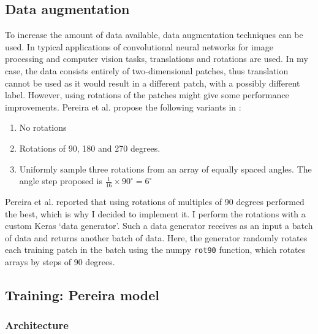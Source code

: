 \documentclass[12pt,a4paper,twoside,openright]{report}
\begin{document}
\subsection{Data augmentation}
To increase the amount of data available, data augmentation techniques can be used. In typical applications of convolutional neural networks for image processing and computer vision tasks, translations and rotations are used. In my case, the data consists entirely of two-dimensional patches, thus translation cannot be used as it would result in a different patch, with a possibly different label. However, using rotations of the patches might give some performance improvements. Pereira et al. propose the following variants in \cite{pereira}:
\begin{enumerate}
	\item No rotations
	\item Rotations of 90, 180 and 270 degrees.
	\item Uniformly sample three rotations from an array of equally spaced angles. The angle step proposed is $\frac{1}{16} \times 90^{\circ} = 6^{\circ}$
\end{enumerate}
Pereira et al. reported that using rotations of multiples of 90 degrees performed the best, which is why I decided to implement it. I perform the rotations with a custom Keras `data generator'. Such a data generator receives as an input a batch of data and returns another batch of data. Here, the generator randomly rotates each training patch in the batch using the numpy \texttt{rot90} function, which rotates arrays by steps of 90 degrees.

\subsection{Training: Pereira model}

\subsubsection{Architecture}
\end{document}
